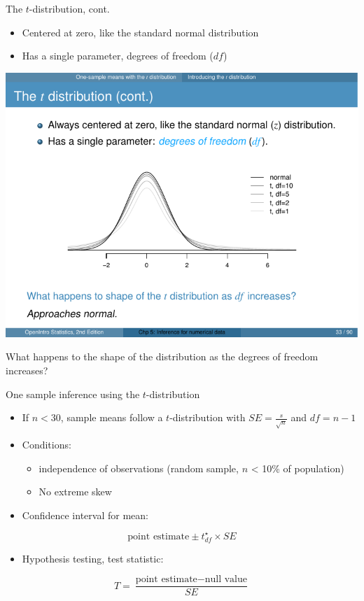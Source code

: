 \documentclass[presentation]{beamer}
\begin{document}
\begin{frame}[label={sec:orgdc0209f}]{The \(t\)-distribution, cont.}
\begin{itemize}
\item Centered at zero, like the standard normal distribution

\item Has a single parameter, \alert{\alert{degrees of freedom}} (\(df\))
\end{itemize}

\begin{center}
\includegraphics[height=0.40\textheight]{fig-tdistn-df.pdf}
\end{center}

What happens to the shape of the distribution as the degrees of freedom increases?
\end{frame}

\begin{frame}[label={sec:orga3e0574}]{One sample inference using the \(t\)-distribution}
\begin{itemize}
\item If \(n < 30\), sample means follow a \(t\)-distribution with \(SE = \frac{s}{\sqrt{n}}\) and \(df = n - 1\)
\item Conditions:
\begin{itemize}
\item independence of observations (random sample, \(n\) < 10\% of population)
\item No extreme skew
\end{itemize}
\item Confidence interval for mean:
\end{itemize}
\[
\text{point estimate} \pm t_{df}^{\star} \times SE
\]
\begin{itemize}
\item Hypothesis testing, test statistic:
\end{itemize}
\[
T = \frac{\text{point estimate} - \text{null value}}{SE}
\]
\end{frame}
\end{document}
